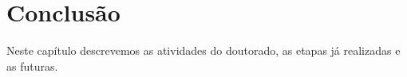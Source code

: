 \chapter{Conclusão}
\label{sec:Conclusão}

Neste capítulo descrevemos as atividades do doutorado, as etapas já realizadas e as futuras.


%
%
%
%
%
%
%
%
%

